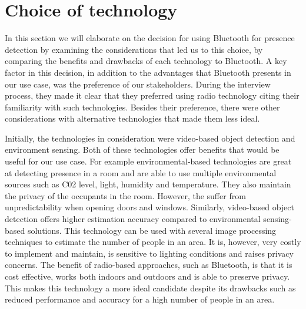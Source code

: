 \section{Choice of technology}
In this section we will elaborate on the decision for using Bluetooth for presence detection by examining the considerations that led us to this choice, by comparing the benefits and drawbacks of each technology to Bluetooth.
A key factor in this decision, in addition to the advantages that Bluetooth presents in our use case, was the preference of our stakeholders. During the interview process, they made it clear that they preferred using radio technology citing their familiarity with such technologies. 
Besides their preference, there were other considerations with alternative technologies that made them less ideal.

Initially, the technologies in consideration were video-based object detection and environment sensing. Both of these technologies offer benefits that would be useful for our use case. 
For example environmental-based technologies are great at detecting presence in a room and are able to use multiple environmental sources such as C02 level, light, humidity and temperature. 
They also maintain the privacy of the occupants in the room. However, the suffer from unpredictability when opening doors and windows. 
Similarly, video-based object detection offers higher estimation accuracy compared to environmental sensing-based solutions. This technology can be used with several image processing techniques to estimate the number of people in an area. It is, however, very costly to implement and maintain, is sensitive to lighting conditions and raises privacy concerns.
The benefit of radio-based approaches, such as Bluetooth, is that it is cost effective, works both indoors and outdoors and is able to preserve privacy. This makes this technology a more ideal candidate despite its drawbacks such as reduced performance and accuracy for a high number of people in an area. 


